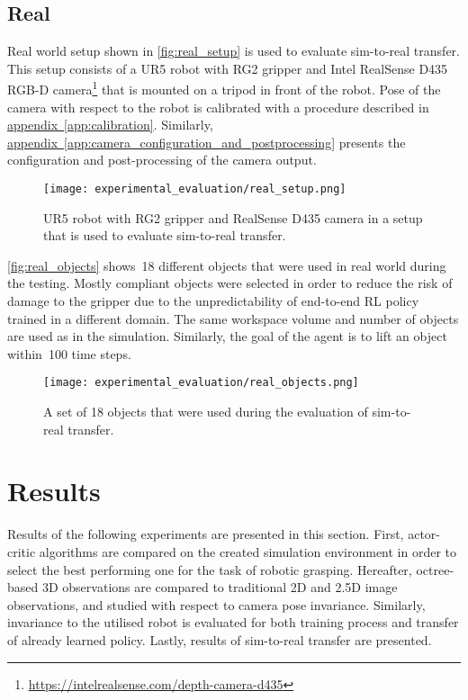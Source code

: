 \subsection{Real}\label{subsec:real_setup}

Real world setup shown in \autoref{fig:real_setup} is used to evaluate sim-to-real transfer. This setup consists of a UR5 robot with RG2 gripper and Intel RealSense D435 RGB-D camera\footnote{\href{https://intelrealsense.com/depth-camera-d435}{https://intelrealsense.com/depth-camera-d435}} that is mounted on a tripod in front of the robot. Pose of the camera with respect to the robot is calibrated with a procedure described in \hyperref[app:calibration]{appendix~\ref*{app:calibration}}. Similarly, \hyperref[app:camera_configuration_and_postprocessing]{appendix~\ref*{app:camera_configuration_and_postprocessing}} presents the configuration and post-processing of the camera output.

\begin{figure}[ht]
    \centering
    \texttt{[image: experimental\_evaluation/real\_setup.png]}
    \caption{UR5 robot with RG2 gripper and RealSense D435 camera in a setup that is used to evaluate sim-to-real transfer.}
    \label{fig:real_setup}
\end{figure}

\autoref{fig:real_objects} shows~18 different objects that were used in real world during the testing. Mostly compliant objects were selected in order to reduce the risk of damage to the gripper due to the unpredictability of end-to-end RL policy trained in a different domain. The same workspace volume and number of objects are used as in the simulation. Similarly, the goal of the agent is to lift an object within~100 time steps.

\begin{figure}[ht]
    \centering
    \texttt{[image: experimental\_evaluation/real\_objects.png]}
    \caption{A set of 18 objects that were used during the evaluation of sim-to-real transfer.}
    \label{fig:real_objects}
\end{figure}


\section{Results}

Results of the following experiments are presented in this section. First, actor-critic algorithms are compared on the created simulation environment in order to select the best performing one for the task of robotic grasping. Hereafter, octree-based 3D observations are compared to traditional 2D and 2.5D image observations, and studied with respect to camera pose invariance. Similarly, invariance to the utilised robot is evaluated for both training process and transfer of already learned policy. Lastly, results of sim-to-real transfer are presented.

